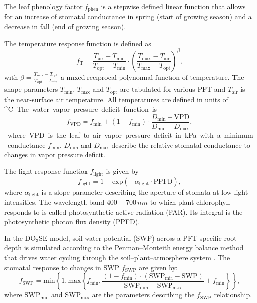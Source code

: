 \documentclass[bg, manuscript]{copernicus}
\begin{document}
The leaf phenology factor $f_\mathrm{phen}$ is a stepwise defined linear function that allows for an increase of stomatal conductance in spring (start of growing season) and a decrease in fall (end of growing season).

The temperature response function is defined as
%
\begin{equation}
  f_\mathrm{T} = \frac{T_\text{air}-T_\text{min}}{T_\text{opt}-T_\text{min}} \cdot \left(\frac{T_{\text{max}}-T_\text{air}}{T_{\text{max}}-T_\text{opt}}\right)^\beta,
  \label{eq:f_temp}
\end{equation}
with $\beta = \frac{T_\text{max}-T_\text{opt}}{T_\text{opt}-T_\text{min}}$ a mixed reciprocal polynomial function of temperature. The shape parameters $T_\text{min}$, $T_\text{max}$ and $T_\text{opt}$ are tabulated for various PFT and $T_\mathrm{air}$ is the near-surface air temperature. All temperatures are defined in units of \unit{^\circ C}.

The water vapor pressure deficit function is
%
\begin{equation}
  f_\mathrm{VPD} = f_\text{min}+(1-f_\text{min}) \cdot \frac{D_\text{min} - \text{VPD}}{D_\text{min}-D_\text{max}},
  \label{eq:f_vpd}
\end{equation}
%
where VPD is the leaf to air vapor pressure deficit in \unit{kPa} with a minimum conductance $f_\text{min}$. $D_\text{min}$ and $D_\text{max}$ describe the relative stomatal conductance to changes in vapor pressure deficit.

The light response function $f_\mathrm{light}$ is given by
%
\begin{equation}
  f_\text{light} = 1-\text{exp}(-\alpha_\text{light}\cdot \text{PPFD}),
  \label{eq:flight}
\end{equation}
%
where $\alpha_\mathrm{light}$ is a slope parameter describing the aperture of stomata at low light intensities. The wavelength band $400-700\,\unit{nm}$ to which plant chlorophyll responds to is called photosynthetic active radiation (PAR). Its integral is the photosynthetic photon flux density (PPFD).

In the $\mathrm{DO_3SE}$ model, soil water potential (SWP) across a PFT specific root depth is simulated according to the Penman--Monteith energy balance method that drives water cycling through the soil--plant--atmosphere system \citep{ACP:Bueker2012}. The stomatal response to changes in SWP $f_\mathrm{SWP}$ are given by:
%
\begin{equation}
  f_\mathrm{SWP} = \text{min}\left\{1, \text{max}\left\{f_\mathrm{min}, \frac{(1 - f_\mathrm{min})\cdot(\mathrm{SWP_{min}} - \mathrm{SWP})}{\mathrm{SWP_{min}} - \mathrm{SWP_{max}}} + f_\mathrm{min} \right\} \right\},
    \label{eq:fsw}
\end{equation}
%
where $\mathrm{SWP_{min}}$ and $\mathrm{SWP_{max}}$ are the parameters describing the $f_\mathrm{SWP}$ relationship.
\end{document}
